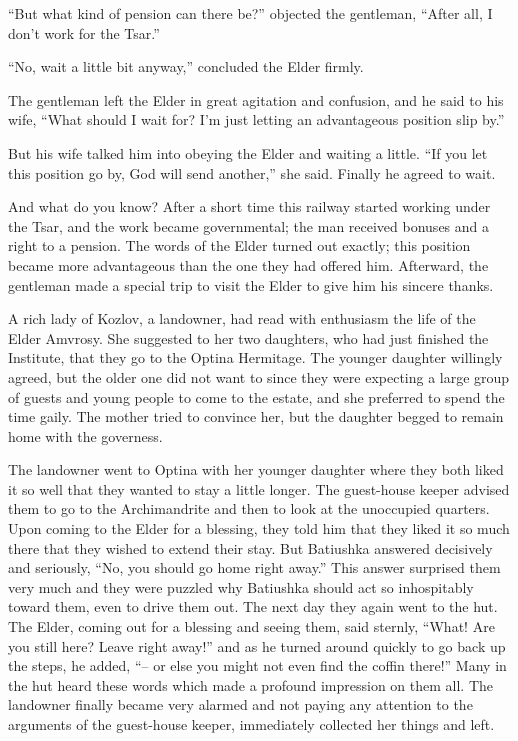 ``But what kind of pension can there be?'' objected the gentleman, ``After all, I don't work for the Tsar.''

``No, wait a little bit anyway,'' concluded the Elder firmly.

The gentleman left the Elder in great agitation and confusion, and he said to his wife, ``What should I wait for? I'm just letting an advantageous position slip by.''

But his wife talked him into obeying the Elder and waiting a little. ``If you let this position go by, God will send another,'' she said. Finally he agreed to wait.

And what do you know? After a short time this railway started working under the Tsar, and the work became governmental; the man received bonuses and a right to a pension. The words of the Elder turned out exactly; this position became more advantageous than the one they had offered him. Afterward, the gentleman made a special trip to visit the Elder to give him his sincere thanks.

A rich lady of Kozlov, a landowner, had read with enthusiasm the life of the Elder Amvrosy. She suggested to her two daughters, who had just finished the Institute, that they go to the Optina Hermitage. The younger daughter willingly agreed, but the older one did not want to since they were expecting a large group of guests and young people to come to the estate, and she preferred to spend the time gaily. The mother tried to convince her, but the daughter begged to remain home with the governess.

The landowner went to Optina with her younger daughter where they both liked it so well that they wanted to stay a little longer. The guest-house keeper advised them to go to the Archimandrite and then to look at the unoccupied quarters. Upon coming to the Elder for a blessing, they told him that they liked it so much there that they wished to extend their stay. But Batiushka answered decisively and seriously, ``No, you should go home right away.'' This answer surprised them very much and they were puzzled why Batiushka should act so inhospitably toward them, even to drive them out. The next day they again went to the hut. The Elder, coming out for a blessing and seeing them, said sternly, ``What! Are you still here? Leave right away!'' and as he turned around quickly to go back up the steps, he added, ``-- or else you might not even find the coffin there!'' Many in the hut heard these words which made a profound impression on them all. The landowner finally became very alarmed and not paying any attention to the arguments of the guest-house keeper, immediately collected her things and left.

